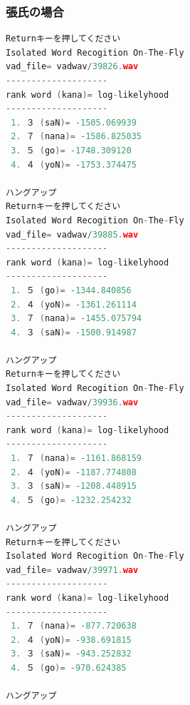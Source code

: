 \documentclass[11pt,a4paper, uplatex]{jsarticle}
\begin{document}
\subsubsection{張氏の場合}
\begin{lstlisting}[language=c, caption=\texttt{recog}実行結果(張氏)]
Returnキーを押してください
Isolated Word Recogition On-The-Fly
vad_file= vadwav/39826.wav
--------------------
rank word (kana)= log-likelyhood
--------------------
 1. ３ (saN)= -1505.069939
 2. ７ (nana)= -1586.825035
 3. ５ (go)= -1748.309120
 4. ４ (yoN)= -1753.374475

ハングアップ   
Returnキーを押してください
Isolated Word Recogition On-The-Fly
vad_file= vadwav/39885.wav
--------------------
rank word (kana)= log-likelyhood
--------------------
 1. ５ (go)= -1344.840856
 2. ４ (yoN)= -1361.261114
 3. ７ (nana)= -1455.075794
 4. ３ (saN)= -1500.914987

ハングアップ   
Returnキーを押してください
Isolated Word Recogition On-The-Fly
vad_file= vadwav/39936.wav
--------------------
rank word (kana)= log-likelyhood
--------------------
 1. ７ (nana)= -1161.868159
 2. ４ (yoN)= -1187.774808
 3. ３ (saN)= -1208.448915
 4. ５ (go)= -1232.254232

ハングアップ   
Returnキーを押してください
Isolated Word Recogition On-The-Fly
vad_file= vadwav/39971.wav
--------------------
rank word (kana)= log-likelyhood
--------------------
 1. ７ (nana)= -877.720638
 2. ４ (yoN)= -938.691815
 3. ３ (saN)= -943.252832
 4. ５ (go)= -970.624385

ハングアップ   
\end{lstlisting}
\end{document}
